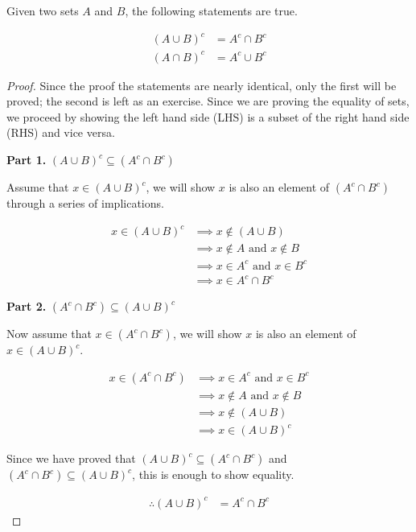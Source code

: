 \documentclass[twoside]{report}
\newcommand{\header}[2]{\begin{flushright} \textbf{#1} #2 \end{flushright}}
\begin{document}
\begin{theorem}
	Given two sets $A$ and $B$, the following statements are true.
	
	\begin{align}
		(A \cup B)^c &= A^c \cap B^c \\
		(A \cap B)^c &= A^c \cup B^c
	\end{align}
\end{theorem}

\begin{proof}
	Since the proof the statements are nearly identical, only the first will be proved; the second is left as an exercise. Since we are proving the equality of sets, we proceed by showing the left hand side (LHS) is a subset of the right hand side (RHS) and vice versa.
	
	\header{Part 1.}{$(A \cup B)^c \subseteq (A^c \cap B^c)$}
	
	Assume that $x \in (A \cup B)^c$, we will show $x$ is also an element of $(A^c \cap B^c)$ through a series of implications.
	
	\begin{align*}
		x \in (A \cup B)^c &\implies x \notin (A \cup B) \\
		&\implies x \notin A \text{ and } x \notin B \\
		&\implies x \in A^c \text{ and } x \in B^c \\
		&\implies x \in A^c \cap B^c
	\end{align*}
		
	\header{Part 2.}{$(A^c \cap B^c) \subseteq (A \cup B)^c$}
	
	Now assume that $x \in (A^c \cap B^c)$, we will show $x$ is also an element of $x \in (A \cup B)^c$.
	
	\begin{align*}
		x \in (A^c \cap B^c) &\implies x \in A^c \text{ and } x \in B^c \\
		&\implies x \notin A \text{ and } x \notin B \\
		&\implies x \notin (A \cup B) \\
		&\implies x \in (A \cup B)^c
	\end{align*}
	
	Since we have proved that $(A \cup B)^c \subseteq (A^c \cap B^c)$ and $(A^c \cap B^c) \subseteq (A \cup B)^c$, this is enough to show equality.
	
	\begin{align*}
		\therefore (A \cup B)^c &= A^c \cap B^c
	\end{align*}
\end{proof}
\vspace{\baselineskip}
\end{document}
